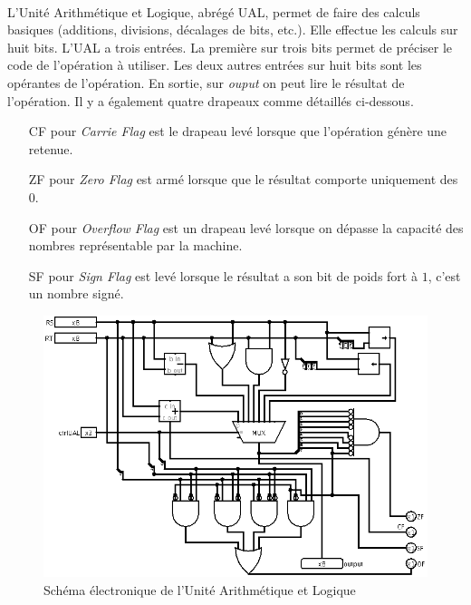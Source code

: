 \paragraph{}{
	L'Unité Arithmétique et Logique, abrégé UAL, permet de faire des calculs
	basiques (additions, divisions, décalages de bits, etc.). Elle effectue
	les calculs sur huit bits. L'UAL a trois entrées. La première sur trois bits
	permet de préciser le code de l'opération à utiliser. Les deux autres entrées
	sur huit bits sont les opérantes de l'opération. \newline
	En sortie, sur \textit{ouput} on peut lire le résultat de l'opération. Il
	y a également quatre drapeaux comme détaillés ci-dessous.
}

\begin{itemize}
	\item[CF] pour \textit{Carrie Flag} est le drapeau levé lorsque que l'opération
	génère une retenue.
	\item[ZF] pour \textit{Zero Flag} est armé lorsque que le résultat comporte uniquement
	des $0$.
	\item[OF] pour \textit{Overflow Flag} est un drapeau levé lorsque on dépasse
	la capacité des nombres représentable par la machine.
	\item[SF] pour \textit{Sign Flag} est levé lorsque le résultat a son
	bit de poids fort à $1$, c'est un nombre signé.
\end{itemize}

\begin{figure}
	\centering
	\includegraphics[scale=0.4,origin=c]{circuits/UAL.png}
	\caption{
		\label{ual_circ}
		Sch\'{e}ma \'{e}lectronique de l'Unit\'{e} Arithm\'{e}tique et Logique
	}
\end{figure}

